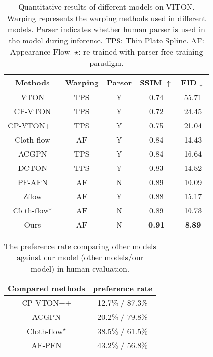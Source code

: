 \documentclass[10pt,twocolumn,letterpaper]{article}
\begin{document}
\begin{table}[t]
    \centering
    \small\addtolength{\tabcolsep}{-1pt}
    \begin{tabular}{c|c|c|c|c}
    \toprule
         Methods & Warping& Parser& SSIM $\uparrow$& FID$\downarrow$\\
         \midrule
         VTON \cite{han2018viton}& TPS& Y &0.74& 55.71\\
         CP-VTON \cite{wang2018toward}&TPS&Y &0.72 &24.45\\
         CP-VTON++ \cite{minar2020cp}& TPS&Y&0.75& 21.04\\
         Cloth-flow\cite{han2019clothflow}&AF&Y&0.84& 14.43\\ 
         ACGPN\cite{yang2020towards}& TPS&Y&0.84& 16.64\\
         DCTON\cite{ge2021disentangled}&TPS&Y& 0.83& 14.82\\
         PF-AFN\cite{ge2021parser} &AF&N&0.89 &10.09\\
         Zflow \cite{chopra2021zflow}&AF&Y&0.88&15.17\\ 
         $\text{Cloth-flow}^{\star}$\cite{han2019clothflow}&AF&N&0.89& 10.73\\
         \midrule
         Ours&AF&N&\textbf{0.91}&\textbf{8.89}\\
         \bottomrule
    \end{tabular}
    \caption{Quantitative results of different models on VITON. Warping represents the warping methods used in different models. Parser indicates whether human parser is used in the model during inference. TPS: Thin Plate Spline. AF: Appearance Flow. $\star$: re-trained with parser free training paradigm.}
    \label{tab:tab1}
\end{table}

\begin{table}[t]
    \centering
    \begin{tabular}{c|c}
    \toprule
         Compared methods & preference rate\\
         \midrule
         
         CP-VTON++ \cite{minar2020cp}& 12.7\% / 87.3\%\\
         
         ACGPN\cite{yang2020towards}& 20.2\% / 79.8\%\\
         
         $\text{Cloth-flow}^{\star}$\cite{han2019clothflow}& 38.5\% / 61.5\%\\
         
         AF-PFN\cite{ge2021parser}&43.2\% / 56.8\%\\
         
         \bottomrule
    \end{tabular}
    \vspace{-0.2cm}
    \caption{The preference rate comparing other models against our model (other models/our model) in human evaluation.}
    \label{tab:tab2}
    \vspace{-0.4cm}
\end{table}
\end{document}
